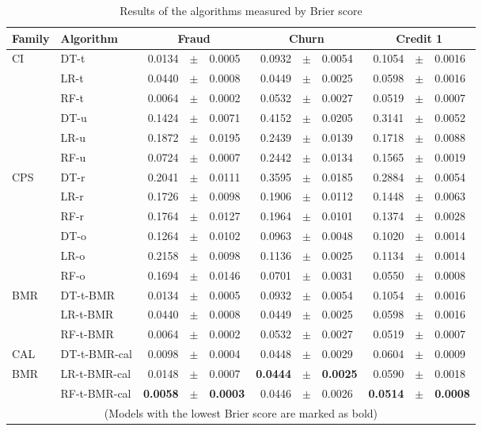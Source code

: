  \begin{table}[!t]
    \centering
    \footnotesize
    \begin{tabular}{l l r@{\hskip 0in}c@{\hskip 0in}l r@{\hskip 0in}c@{\hskip 0in}l r@{\hskip 
    0in}c@{\hskip 0in}l  } %
    \hline
    \bf{Family} & \bf{Algorithm} & \multicolumn{3}{c}{\bf{Fraud}} & 
    \multicolumn{3}{c}{\bf{Churn}} & \multicolumn{3}{c}{\bf{Credit 1}} \\ 
    \hline
CI&DT-t & 0.0134 &$\pm$& 0.0005 & 0.0932 &$\pm$& 0.0054 & 0.1054 &$\pm$& 0.0016\\ 
&LR-t & 0.0440 &$\pm$& 0.0008 & 0.0449 &$\pm$& 0.0025 & 0.0598 &$\pm$& 0.0016\\ 
&RF-t & 0.0064 &$\pm$& 0.0002 & 0.0532 &$\pm$& 0.0027 & 0.0519 &$\pm$& 0.0007\\ 
&DT-u & 0.1424 &$\pm$& 0.0071 & 0.4152 &$\pm$& 0.0205 & 0.3141 &$\pm$& 0.0052\\ 
&LR-u & 0.1872 &$\pm$& 0.0195 & 0.2439 &$\pm$& 0.0139 & 0.1718 &$\pm$& 0.0088\\ 
&RF-u & 0.0724 &$\pm$& 0.0007 & 0.2442 &$\pm$& 0.0134 & 0.1565 &$\pm$& 0.0019\\ 
\hline 
CPS&DT-r & 0.2041 &$\pm$& 0.0111 & 0.3595 &$\pm$& 0.0185 & 0.2884 &$\pm$& 0.0054\\ 
&LR-r & 0.1726 &$\pm$& 0.0098 & 0.1906 &$\pm$& 0.0112 & 0.1448 &$\pm$& 0.0063\\ 
&RF-r & 0.1764 &$\pm$& 0.0127 & 0.1964 &$\pm$& 0.0101 & 0.1374 &$\pm$& 0.0028\\ 
&DT-o & 0.1264 &$\pm$& 0.0102 & 0.0963 &$\pm$& 0.0048 & 0.1020 &$\pm$& 0.0014\\ 
&LR-o & 0.2158 &$\pm$& 0.0098 & 0.1136 &$\pm$& 0.0025 & 0.1134 &$\pm$& 0.0014\\ 
&RF-o & 0.1694 &$\pm$& 0.0146 & 0.0701 &$\pm$& 0.0031 & 0.0550 &$\pm$& 0.0008\\ 
\hline 
BMR&DT-t-BMR & 0.0134 &$\pm$& 0.0005 & 0.0932 &$\pm$& 0.0054 & 0.1054 &$\pm$& 0.0016\\ 
&LR-t-BMR & 0.0440 &$\pm$& 0.0008 & 0.0449 &$\pm$& 0.0025 & 0.0598 &$\pm$& 0.0016\\ 
&RF-t-BMR & 0.0064 &$\pm$& 0.0002 & 0.0532 &$\pm$& 0.0027 & 0.0519 &$\pm$& 0.0007\\ 
\hline 
CAL&DT-t-BMR-cal & 0.0098 &$\pm$& 0.0004 & 0.0448 &$\pm$& 0.0029 & 0.0604 &$\pm$& 0.0009\\ 
BMR&LR-t-BMR-cal & 0.0148 &$\pm$& 0.0007 & \bf{0.0444} &\bf{$\pm$}& \bf{0.0025} & 0.0590 &$\pm$& 
0.0018\\ 
&RF-t-BMR-cal & \bf{0.0058} &\bf{$\pm$}& \bf{0.0003} & 0.0446 &$\pm$& 0.0026 & \bf{0.0514} 
&\bf{$\pm$}& \bf{0.0008}\\ 
\hline
  \multicolumn{11}{c}{(Models with the lowest Brier score are marked as bold)}
  \end{tabular}
    \caption{Results of the algorithms measured by Brier score}
    \label{tab:6:results_brier}
\end{table}

